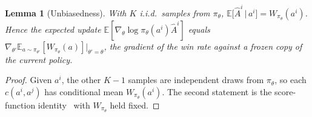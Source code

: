 \documentclass[11pt]{article}
\newtheorem{lemma}{Lemma}
\theoremstyle{remark}
\newcommand{\E}{\mathbb{E}}
\begin{document}
\begin{lemma}[Unbiasedness]
\label{lem:unbiased}
With $K$ i.i.d.\ samples from $\pi_\theta$, $\E\big[\hat A^i\,\big|\,a^i\big]=W_{\pi_\theta}(a^i)$. Hence the expected update $\E[\nabla_\theta\log\pi_\theta(a^i)\hat A^i]$ equals $\nabla_{\theta'}\E_{a\sim\pi_{\theta'}}[W_{\pi_\theta}(a)]\big|_{\theta'=\theta}$, the gradient of the win rate against a frozen copy of the current policy.
\end{lemma}
\begin{proof}
Given $a^i$, the other $K-1$ samples are independent draws from $\pi_\theta$, so each $c(a^i,a^j)$ has conditional mean $W_{\pi_\theta}(a^i)$. The second statement is the score-function identity~\citep{williams1992reinforce} with $W_{\pi_\theta}$ held fixed.
\end{proof}
\end{document}
